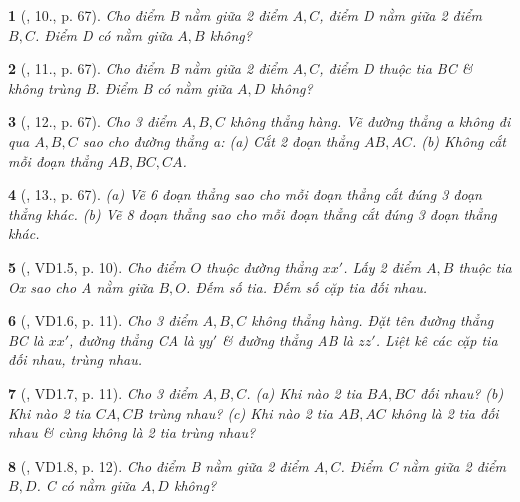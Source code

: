 \documentclass{article}
\newtheorem{baitoan}{}
\begin{document}
\begin{baitoan}[\cite{Binh_Toan_6_tap_2}, 10., p. 67]
	Cho điểm B nằm giữa 2 điểm $A,C$, điểm D nằm giữa 2 điểm $B,C$. Điểm D có nằm giữa $A,B$ không?
\end{baitoan}

\begin{baitoan}[\cite{Binh_Toan_6_tap_2}, 11., p. 67]
	Cho điểm B nằm giữa 2 điểm $A,C$, điểm D thuộc tia BC \& không trùng B. Điểm B có nằm giữa $A,D$ không?
\end{baitoan}

\begin{baitoan}[\cite{Binh_Toan_6_tap_2}, 12., p. 67]
	Cho 3 điểm $A,B,C$ không thẳng hàng. Vẽ đường thẳng a không đi qua $A,B,C$ sao cho đường thẳng a: (a) Cắt 2 đoạn thẳng $AB,AC$. (b) Không cắt mỗi đoạn thẳng $AB,BC,CA$.
\end{baitoan}

\begin{baitoan}[\cite{Binh_Toan_6_tap_2}, 13., p. 67]
	(a) Vẽ 6 đoạn thẳng sao cho mỗi đoạn thẳng cắt đúng 3 đoạn thẳng khác. (b) Vẽ 8 đoạn thẳng sao cho mỗi đoạn thẳng cắt đúng 3 đoạn thẳng khác.
\end{baitoan}

\begin{baitoan}[\cite{TLCT_THCS_Toan_6_hinh_hoc}, VD1.5, p. 10]
	Cho điểm $O$ thuộc đường thẳng $xx'$. Lấy 2 điểm $A,B$ thuộc tia Ox sao cho A nằm giữa $B,O$. Đếm số tia. Đếm số cặp tia đối nhau.
\end{baitoan}

\begin{baitoan}[\cite{TLCT_THCS_Toan_6_hinh_hoc}, VD1.6, p. 11]
	Cho 3 điểm $A,B,C$ không thẳng hàng. Đặt tên đường thẳng BC là $xx'$, đường thẳng CA là $yy'$ \& đường thẳng AB là $zz'$. Liệt kê các cặp tia đối nhau, trùng nhau.
\end{baitoan}

\begin{baitoan}[\cite{TLCT_THCS_Toan_6_hinh_hoc}, VD1.7, p. 11]
	Cho 3 điểm $A,B,C$. (a) Khi nào 2 tia $BA,BC$ đối nhau? (b) Khi nào 2 tia $CA,CB$ trùng nhau? (c) Khi nào 2 tia $AB,AC$ không là 2 tia đối nhau \& cùng không là 2 tia trùng nhau?
\end{baitoan}

\begin{baitoan}[\cite{TLCT_THCS_Toan_6_hinh_hoc}, VD1.8, p. 12]
	Cho điểm B nằm giữa 2 điểm $A,C$. Điểm C nằm giữa 2 điểm $B,D$. C có nằm giữa $A,D$ không?
\end{baitoan}
\end{document}
